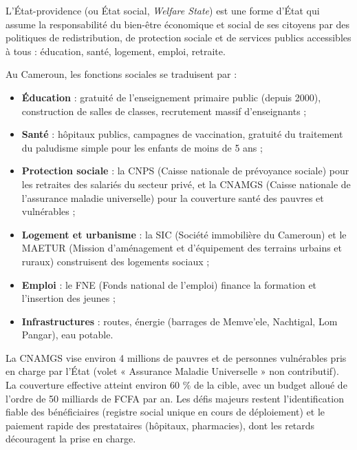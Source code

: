 \documentclass[11pt]{article}
\newcommand{\cle}[1]{{\popxbold\color{popdark}#1}}
\begin{document}
\begin{definition}
L'\cle{État-providence} (ou État social, \emph{Welfare State}) est une forme d'État qui assume la responsabilité du bien-être économique et social de ses citoyens par des politiques de \cle{redistribution}, de \cle{protection sociale} et de \cle{services publics} accessibles à tous : éducation, santé, logement, emploi, retraite.
\end{definition}

Au Cameroun, les fonctions sociales se traduisent par :
\begin{itemize}
\item \textbf{Éducation} : gratuité de l'enseignement primaire public (depuis 2000), construction de salles de classes, recrutement massif d'enseignants ;
\item \textbf{Santé} : hôpitaux publics, campagnes de vaccination, gratuité du traitement du paludisme simple pour les enfants de moins de 5 ans ;
\item \textbf{Protection sociale} : la \cle{CNPS} (Caisse nationale de prévoyance sociale) pour les retraites des salariés du secteur privé, et la \cle{CNAMGS} (Caisse nationale de l'assurance maladie universelle) pour la couverture santé des pauvres et vulnérables ;
\item \textbf{Logement et urbanisme} : la SIC (Société immobilière du Cameroun) et le MAETUR (Mission d'aménagement et d'équipement des terrains urbains et ruraux) construisent des logements sociaux ;
\item \textbf{Emploi} : le FNE (Fonds national de l'emploi) finance la formation et l'insertion des jeunes ;
\item \textbf{Infrastructures} : routes, énergie (barrages de Memve'ele, Nachtigal, Lom Pangar), eau potable.
\end{itemize}

\begin{exemplebox}
La CNAMGS vise environ 4 millions de pauvres et de personnes vulnérables pris en charge par l'État (volet « Assurance Maladie Universelle » non contributif). La couverture effective atteint environ 60 \% de la cible, avec un budget alloué de l'ordre de 50 milliards de FCFA par an. Les défis majeurs restent l'identification fiable des bénéficiaires (registre social unique en cours de déploiement) et le paiement rapide des prestataires (hôpitaux, pharmacies), dont les retards découragent la prise en charge.
\end{exemplebox}
\end{document}
